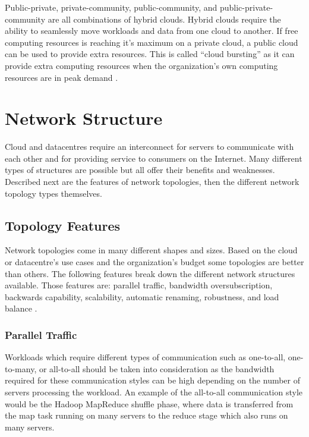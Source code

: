 \documentclass[fullapage,12pt]{article}
\begin{document}
Public-private, private-community, public-community, and public-private-community are all combinations of hybrid clouds. Hybrid clouds require the ability to seamlessly move workloads and data from one cloud to another. If free computing resources is reaching it's maximum on a private cloud, a public cloud can be used to provide extra resources. This is called ``cloud bursting'' as it can provide extra computing resources when the organization's own computing resources are in peak demand \cite{dillon2010cloud}.




\section{Network Structure} \label{sec:network-structure}

Cloud and datacentres require an interconnect for servers to communicate with each other and for providing service to consumers on the Internet. Many different types of structures are possible but all offer their benefits and weaknesses. Described next are the features of network topologies, then the different network topology types themselves.


\subsection{Topology Features} \label{sub:topology-features}

Network topologies come in many different shapes and sizes. Based on the cloud or datacentre's use cases and the organization's budget some topologies are better than others. The following features break down the different network structures available. Those features are: parallel traffic, bandwidth oversubscription, backwards capability, scalability, automatic renaming, robustness, and load balance \cite{wang2015survey}.


\subsubsection{Parallel Traffic} \label{ssub:parallel-traffic}

Workloads which require different types of communication such as one-to-all, one-to-many, or all-to-all should be taken into consideration as the bandwidth required for these communication styles can be high depending on the number of servers processing the workload. An example of the all-to-all communication style would be the Hadoop MapReduce shuffle phase, where data is transferred from the map task running on many servers to the reduce stage which also runs on many servers.
\end{document}
